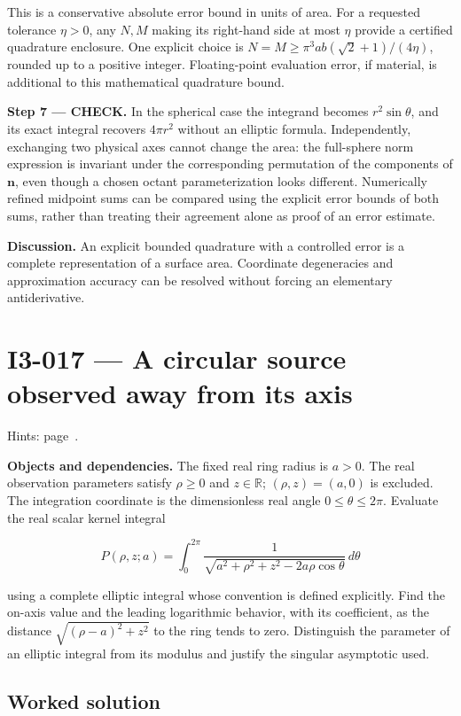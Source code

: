 \documentclass[11pt,oneside,openany]{book}
\begin{document}
This is a conservative absolute error bound in units of area. For a requested tolerance \(\eta>0\), any \(N,M\) making its right-hand side at most \(\eta\) provide a certified quadrature enclosure. One explicit choice is \(N=M\ge\pi^3ab(\sqrt2+1)/(4\eta)\), rounded up to a positive integer. Floating-point evaluation error, if material, is additional to this mathematical quadrature bound.

\textbf{Step 7 --- CHECK.} In the spherical case the integrand becomes \(r^2\sin\theta\), and its exact integral recovers \(4\pi r^2\) without an elliptic formula. Independently, exchanging two physical axes cannot change the area: the full-sphere norm expression is invariant under the corresponding permutation of the components of \(\mathbf n\), even though a chosen octant parameterization looks different. Numerically refined midpoint sums can be compared using the explicit error bounds of both sums, rather than treating their agreement alone as proof of an error estimate.

\textbf{Discussion.} An explicit bounded quadrature with a controlled error is a complete representation of a surface area. Coordinate degeneracies and approximation accuracy can be resolved without forcing an elementary antiderivative.
\clearpage
\section{I3-017 --- A circular source observed away from its axis}
\label{problem:I3-017}
{\small Hints: page~\pageref{hints:I3-017}.}\par\medskip

\textbf{Objects and dependencies.} The fixed real ring radius is \(a>0\). The real observation parameters satisfy \(\rho\ge0\) and \(z\in\mathbb R\); \((\rho,z)=(a,0)\) is excluded. The integration coordinate is the dimensionless real angle \(0\le\theta\le2\pi\). Evaluate the real scalar kernel integral

\[
P(\rho,z;a)=\int_0^{2\pi}\frac{1}{\sqrt{a^2+\rho^2+z^2-2a\rho\cos\theta}}\,d\theta
\]

using a complete elliptic integral whose convention is defined explicitly. Find the on-axis value and the leading logarithmic behavior, with its coefficient, as the distance \(\sqrt{(\rho-a)^2+z^2}\) to the ring tends to zero. Distinguish the parameter of an elliptic integral from its modulus and justify the singular asymptotic used.
\subsection*{Worked solution}
\end{document}

